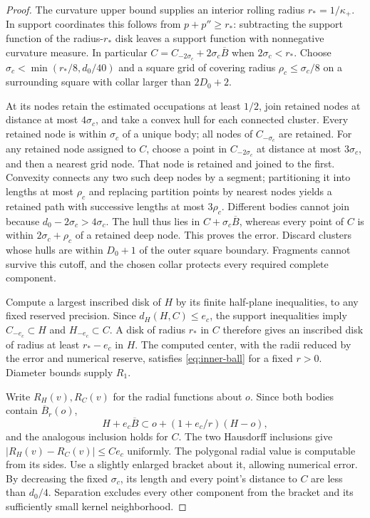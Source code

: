 \begin{proof}
The curvature upper bound supplies an interior rolling radius
$r_* =1/\kappa_+$. In support coordinates this follows from
$p+p''\ge r_*$: subtracting the support function of the radius-$r_*$
disk leaves a support function with nonnegative curvature measure.
In particular $C=C_{-2\sigma_c}+2\sigma_c\overline B$ when
$2\sigma_c<r_*$. Choose $\sigma_c<\min(r_*/8,d_0/40)$ and a square
grid of covering radius $\rho_c\le\sigma_c/8$ on a surrounding
square with collar larger than $2D_0+2$.

At its nodes retain the estimated occupations at least $1/2$, join
retained nodes at distance at most $4\sigma_c$, and take a convex hull
for each connected cluster. Every retained node is within $\sigma_c$
of a unique body; all nodes of $C_{-\sigma_c}$ are retained. For any
retained node assigned to $C$, choose a point in $C_{-2\sigma_c}$ at
distance at most $3\sigma_c$, and then a nearest grid node. That node
is retained and joined to the first. Convexity connects any two such
deep nodes by a segment; partitioning it into lengths at most $\rho_c$
and replacing partition points by nearest nodes yields a retained
path with successive lengths at most $3\rho_c$. Different bodies
cannot join because $d_0-2\sigma_c>4\sigma_c$. The hull thus lies in
$C+\sigma_c\overline B$, whereas every point of $C$ is within
$2\sigma_c+\rho_c$ of a retained deep node. This proves the error.
Discard clusters whose hulls are within $D_0+1$ of the outer square
boundary. Fragments cannot survive this cutoff, and the chosen collar
protects every required complete component.

Compute a largest inscribed disk of $H$ by its finite half-plane
inequalities, to any fixed reserved precision. Since
$d_H(H,C)\le e_c$, the support inequalities imply
$C_{-e_c}\subset H$ and $H_{-e_c}\subset C$. A disk of radius $r_*$
in $C$ therefore gives an inscribed disk of radius at least $r_*-e_c$
in $H$. The computed center, with the radii reduced by the error and
numerical reserve, satisfies \eqref{eq:inner-ball} for a fixed $r>0$.
Diameter bounds supply $R_1$.

Write $R_H(v),R_C(v)$ for the radial functions about $o$. Since both
bodies contain $\overline B_r(o)$,
\[
 H+e_c\overline B\subset o+(1+e_c/r)(H-o),
\]
and the analogous inclusion holds for $C$. The two Hausdorff
inclusions give $|R_H(v)-R_C(v)|\le C e_c$ uniformly. The polygonal
radial value is computable from its sides. Use a slightly enlarged
bracket about it, allowing numerical error. By decreasing the fixed
$\sigma_c$, its length and every point's distance to $C$ are less
than $d_0/4$. Separation excludes every other component from the
bracket and its sufficiently small kernel neighborhood.
\end{proof}

